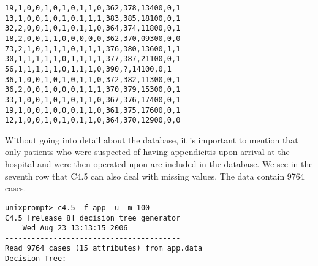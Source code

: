 \documentclass[10pt]{article}
\begin{document}
\begin{verbatim}
19,1,0,0,1,0,1,0,1,1,0,362,378,13400,0,1
13,1,0,0,1,0,1,0,1,1,1,383,385,18100,0,1
32,2,0,0,1,0,1,0,1,1,0,364,374,11800,0,1
18,2,0,0,1,1,0,0,0,0,0,362,370,09300,0,0
73,2,1,0,1,1,1,0,1,1,1,376,380,13600,1,1
30,1,1,1,1,1,0,1,1,1,1,377,387,21100,0,1
56,1,1,1,1,1,0,1,1,1,0,390,?,14100,0,1
36,1,0,0,1,0,1,0,1,1,0,372,382,11300,0,1
36,2,0,0,1,0,0,0,1,1,1,370,379,15300,0,1
33,1,0,0,1,0,1,0,1,1,0,367,376,17400,0,1
19,1,0,0,1,0,0,0,1,1,0,361,375,17600,0,1
12,1,0,0,1,0,1,0,1,1,0,364,370,12900,0,0
\end{verbatim}

Without going into detail about the database, it is important to mention that only patients who were suspected of having appendicitis upon arrival at the hospital and were then operated upon are included in the database. We see in the seventh row that C4.5 can also deal with missing values. The data contain 9764 cases.

\begin{verbatim}
unixprompt> c4.5 -f app -u -m 100
C4.5 [release 8] decision tree generator
    Wed Aug 23 13:13:15 2006
----------------------------------------
Read 9764 cases (15 attributes) from app.data
Decision Tree:
\end{verbatim}
\end{document}

